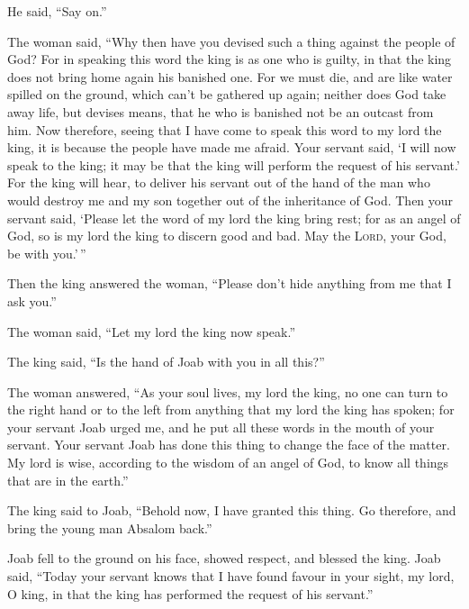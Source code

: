 He said, ``Say on.''

 The woman said, ``Why then have you devised such a thing
against the people of God? For in speaking this word the king is as one
who is guilty, in that the king does not bring home again his banished
one.  For we must die, and are like water spilled on the
ground, which can't be gathered up again; neither does God take away
life, but devises means, that he who is banished not be an outcast from
him.  Now therefore, seeing that I have come to speak
this word to my lord the king, it is because the people have made me
afraid. Your servant said, `I will now speak to the king; it may be that
the king will perform the request of his servant.'  For
the king will hear, to deliver his servant out of the hand of the man
who would destroy me and my son together out of the inheritance of God.
 Then your servant said, `Please let the word of my lord
the king bring rest; for as an angel of God, so is my lord the king to
discern good and bad. May the \textsc{Lord}, your God, be with you.'\,''

 Then the king answered the woman, ``Please don't hide
anything from me that I ask you.''

The woman said, ``Let my lord the king now speak.''

 The king said, ``Is the hand of Joab with you in all
this?''

The woman answered, ``As your soul lives, my lord the king, no one can
turn to the right hand or to the left from anything that my lord the
king has spoken; for your servant Joab urged me, and he put all these
words in the mouth of your servant.  Your servant Joab
has done this thing to change the face of the matter. My lord is wise,
according to the wisdom of an angel of God, to know all things that are
in the earth.''

 The king said to Joab, ``Behold now, I have granted this
thing. Go therefore, and bring the young man Absalom back.''

 Joab fell to the ground on his face, showed respect, and
blessed the king. Joab said, ``Today your servant knows that I have
found favour in your sight, my lord, O king, in that the king has
performed the request of his servant.''

